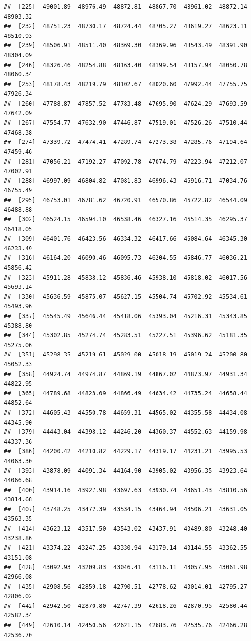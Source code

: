 \documentclass[
]{article}
\begin{document}
\begin{verbatim}
##  [225]  49001.89  48976.49  48872.81  48867.70  48961.02  48872.14  48903.32
##  [232]  48751.23  48730.17  48724.44  48705.27  48619.27  48623.11  48510.93
##  [239]  48506.91  48511.40  48369.30  48369.96  48543.49  48391.90  48304.09
##  [246]  48326.46  48254.88  48163.40  48199.54  48157.94  48050.78  48060.34
##  [253]  48178.43  48219.79  48102.67  48020.60  47992.44  47755.75  47926.34
##  [260]  47788.87  47857.52  47783.48  47695.90  47624.29  47693.59  47642.09
##  [267]  47554.77  47632.90  47446.87  47519.01  47526.26  47510.44  47468.38
##  [274]  47339.72  47474.41  47289.74  47273.38  47285.76  47194.64  47459.46
##  [281]  47056.21  47192.27  47092.78  47074.79  47223.94  47212.07  47002.91
##  [288]  46997.09  46804.82  47081.83  46996.43  46916.71  47034.76  46755.49
##  [295]  46753.01  46781.62  46720.91  46570.86  46722.82  46544.09  46488.88
##  [302]  46524.15  46594.10  46538.46  46327.16  46514.35  46295.37  46418.05
##  [309]  46401.76  46423.56  46334.32  46417.66  46084.64  46345.30  46233.49
##  [316]  46164.20  46090.46  46095.73  46204.55  45846.77  46036.21  45856.42
##  [323]  45911.28  45838.12  45836.46  45938.10  45818.02  46017.56  45693.14
##  [330]  45636.59  45875.07  45627.15  45504.74  45702.92  45534.61  45493.96
##  [337]  45545.49  45646.44  45418.06  45393.04  45216.31  45343.85  45388.80
##  [344]  45302.85  45274.74  45283.51  45227.51  45396.62  45181.35  45275.06
##  [351]  45298.35  45219.61  45029.00  45018.19  45019.24  45200.80  45052.33
##  [358]  44924.74  44974.87  44869.19  44867.02  44873.97  44931.34  44822.95
##  [365]  44789.68  44823.09  44866.49  44634.42  44735.24  44658.44  44852.64
##  [372]  44605.43  44550.78  44659.31  44565.02  44355.58  44434.08  44345.90
##  [379]  44443.04  44398.12  44246.20  44360.37  44552.63  44159.98  44337.36
##  [386]  44200.42  44210.82  44229.17  44319.17  44231.21  43995.53  44063.30
##  [393]  43878.09  44091.34  44164.90  43905.02  43956.35  43923.64  44066.68
##  [400]  43914.16  43927.98  43697.63  43930.74  43651.43  43810.56  43814.68
##  [407]  43748.25  43472.39  43534.15  43464.94  43506.21  43631.05  43563.35
##  [414]  43623.12  43517.50  43543.02  43437.91  43489.80  43248.40  43238.86
##  [421]  43374.22  43247.25  43330.94  43179.14  43144.55  43362.55  43151.08
##  [428]  43092.93  43209.83  43046.41  43116.11  43057.95  43061.98  42966.08
##  [435]  42908.56  42859.18  42790.51  42778.62  43014.01  42795.27  42806.02
##  [442]  42942.50  42870.80  42747.39  42618.26  42870.95  42580.44  42582.34
##  [449]  42610.14  42450.56  42621.15  42683.76  42535.76  42466.28  42536.70

\end{verbatim}
\end{document}

